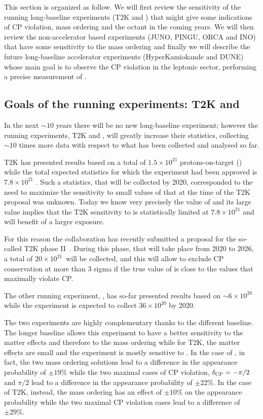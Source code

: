 This section is organized as follow. We will first review the sensitivity of the running long-baseline experiments (T2K and \nova) that might give some indications of CP violation, mass ordering and the \thatm octant in the coming years. We will then review the non-accelerator based experiments (JUNO, PINGU, ORCA and INO) that have some sensitivity to the mass ordering and finally we will describe the future long-baseline accelerator experiments (HyperKamiokande and DUNE) whose main goal is to observe the CP violation in the leptonic sector, performing a precise measurement of \dcp. 


\subsection{Goals of the running experiments: T2K and \nova}
\label{sec:futuret2knova}

In the next $\sim10$ years there will be no new long-baseline experiment; however the running experiments, T2K and \nova, will greatly increase their statistics, collecting $\sim10$ times more data with respect to what has been collected and analysed so far. 

T2K has presented results based on a total of $1.5 \times10^{21}$ protons-on-target (\pot) while the total expected statistics for which the experiment had been approved is $7.8\times10^{21}$ \pot. Such a statistics, that will be collected by 2020, corresponded to the need to maximize the sensitivity to small values of \thint that at the time of the T2K proposal was unknown. Today we know very precisely the value of \thint and its large value implies that the T2K sensitivity to \dcp is statistically limited at $7.8\times10^{21}$ \pot and will benefit of a larger exposure. 

For this reason the collaboration has recently submitted a proposal for the so-called T2K phase II~\cite{Abe:2016tez}. During this phase, that will take place from 2020 to 2026, a total of  $20\times10^{21}$~\pot will be collected, and this will allow to exclude CP conservation at more than 3 sigma if the true value of \dcp is close to the values that maximally violate CP.

The other running experiment, \nova, has so-far presented results based on $\sim6\times10^20$ \pot while the experiment is expected to collect $36\times10^{20}$ \pot by 2020. 

The two experiments are highly complementary thanks to the different baseline. The longer \nova baseline allows this experiment to have a better sensitivity to the matter effects and therefore to the mass ordering while for T2K, the matter effects are small and the experiment is mostly sensitive to \dcp. In the case of \nova, in fact, the two mass ordering solutions lead to a difference in the \nue appearance probability of $\pm19\%$ while the two maximal cases of CP violation, $\delta_{\mathrm{CP}}=-\pi/2$ and $\pi/2$ lead to a difference in the \nue appearance probability of $\pm22\%$. In the case of T2K, instead, the mass ordering has an effect of $\pm10\%$ on the appearance probability while the two maximal CP violation cases lead to a difference of $\pm29\%$. 

